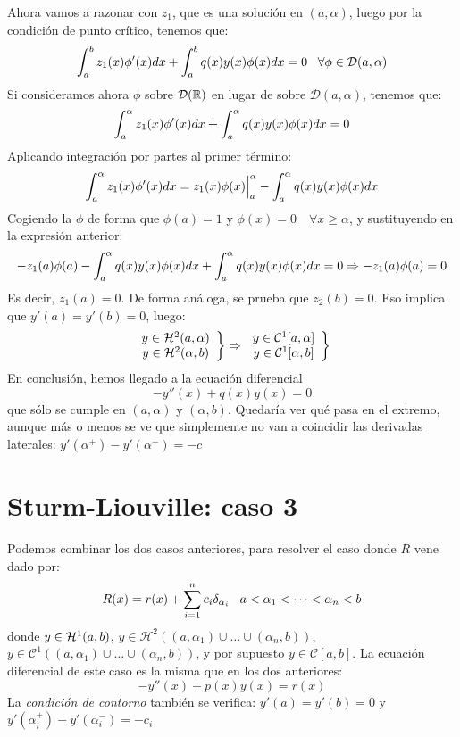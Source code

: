 Ahora vamos a razonar con $z_1$, que es una solución en $(a,\alpha)$, luego por la condición de punto crítico, tenemos que:
\[
\integral{a}{b}{z_1(x)\phi'(x)dx}+\integral{a}{b}{q(x)y(x)\phi(x)dx}=0 \espacio \forall\phi\in\mathcal{D}(a,\alpha)
\]
Si consideramos ahora $\phi$ sobre $\mathcal{D}(\R)$ en lugar de sobre $\mathcal{D}(a,\alpha)$, tenemos que:
\[
\integral{a}{\alpha}{z_1(x)\phi'(x)dx}+\integral{a}{\alpha}{q(x)y(x)\phi(x)dx}=0
\] 
Aplicando integración por partes al primer término:
\[
\integral{a}{\alpha}{z_1(x)\phi'(x)dx}=z_1(x)\phi(x)\Big|_a^\alpha-\integral{a}{\alpha}{q(x)y(x)\phi(x)dx}
\]
Cogiendo la $\phi$ de forma que $\phi(a)=1$ y $\phi(x)=0\quad\forall x\geq\alpha$, y sustituyendo en la expresión anterior:
\[
-z_1(a)\phi(a)-\integral{a}{\alpha}{q(x)y(x)\phi(x)dx}+\integral{a}{\alpha}{q(x)y(x)\phi(x)dx}=0 \Rightarrow -z_1(a)\phi(a)=0
\]
Es decir, $z_1(a)=0$. De forma análoga, se prueba que $z_2(b)=0$. Eso implica que $y'(a)=y'(b)=0$, luego: 
\[
\left.
\begin{array}{cc}
y\in\sobolev[a,\alpha]{2}\\
y\in\sobolev[\alpha,b]{2}
\end{array}
\right\} \Rightarrow
\left.
\begin{array}{cc}
y\in\mathcal{C}^1[a,\alpha]\\
y\in\mathcal{C}^1[\alpha,b]
\end{array}
\right\}
\]
En conclusión, hemos llegado a la ecuación diferencial
\[
-y''(x)+q(x)y(x)=0
\]
que sólo se cumple en $(a,\alpha)$ y $(\alpha,b)$. Quedaría ver qué pasa en el extremo, aunque más o menos se ve que simplemente no van a coincidir las derivadas laterales: $y'(\alpha^+)-y'(\alpha^-)=-c$

\section{Sturm-Liouville: caso 3}

Podemos combinar los dos casos anteriores, para resolver el caso donde $R$ vene dado por:
\[
R(x)=r(x)+\sum_{i=1}^nc_i\delta_{\alpha_i} \espacio a<\alpha_1<\cdots<\alpha_n<b
\]
donde $y\in\sobolev{1}$, $y\in\mathcal{H}^2\left((a,\alpha_1)\cup\dots\cup(\alpha_n,b)\right)$, $y\in\mathcal{C}^1\left((a,\alpha_1)\cup\dots\cup(\alpha_n,b)\right)$, y por supuesto $y\in\mathcal{C}[a,b]$. La ecuación diferencial de este caso es la misma que en los dos anteriores:
\[
-y''(x)+p(x)y(x)=r(x)
\]
La \textit{condición de contorno} también se verifica: $y'(a)=y'(b)=0$ y$y'(\alpha^+_i)-y'(\alpha^-_i)=-c_i$

